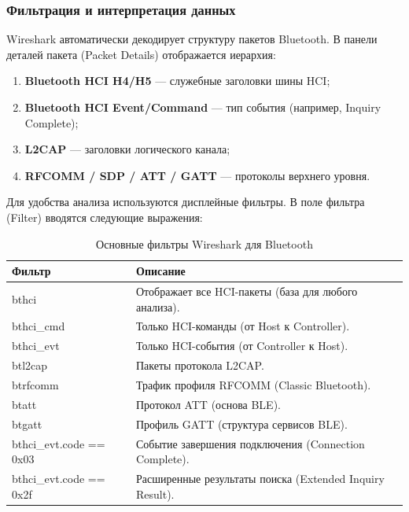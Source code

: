\subsubsection{Фильтрация и интерпретация данных}

Wireshark автоматически декодирует структуру пакетов Bluetooth. В панели деталей пакета (Packet Details) отображается иерархия:
\begin{enumerate}[nosep]
    \item \textbf{Bluetooth HCI H4/H5} — служебные заголовки шины HCI;
    \item \textbf{Bluetooth HCI Event/Command} — тип события (например, Inquiry Complete);
    \item \textbf{L2CAP} — заголовки логического канала;
    \item \textbf{RFCOMM / SDP / ATT / GATT} — протоколы верхнего уровня.
\end{enumerate}

Для удобства анализа используются дисплейные фильтры. В поле фильтра (Filter) вводятся следующие выражения:

\begin{table}[H]
\centering
\caption{Основные фильтры Wireshark для Bluetooth}
\label{tab:wireshark_filters}
\renewcommand{\arraystretch}{1.3}
\begin{tabularx}{\textwidth}{|X|X|}
\hline
\textbf{Фильтр} & \textbf{Описание} \\
\hline
bthci & Отображает все HCI-пакеты (база для любого анализа). \\
\hline
bthci\_cmd & Только HCI-команды (от Host к Controller). \\
\hline
bthci\_evt & Только HCI-события (от Controller к Host). \\
\hline
btl2cap & Пакеты протокола L2CAP. \\
\hline
btrfcomm & Трафик профиля RFCOMM (Classic Bluetooth). \\
\hline
btatt & Протокол ATT (основа BLE). \\
\hline
btgatt & Профиль GATT (структура сервисов BLE). \\
\hline
bthci\_evt.code == 0x03 & Событие завершения подключения (Connection Complete). \\
\hline
bthci\_evt.code == 0x2f & Расширенные результаты поиска (Extended Inquiry Result). \\
\hline
\end{tabularx}
\end{table}

